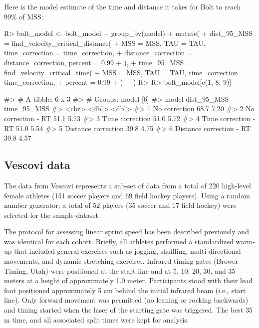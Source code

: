 \documentclass[
]{jss}
\begin{document}
Here is the model estimate of the time and distance it takes for Bolt to reach 99\% of MSS:

\begin{CodeChunk}
\begin{CodeInput}
R> bolt_model <- bolt_model %
+   group_by(model) %
+   mutate(
+     dist_95_MSS = find_velocity_critical_distance(
+       MSS = MSS, TAU = TAU, time_correction = time_correction, 
+       distance_correction = distance_correction, percent = 0.99
+     ),
+    time_95_MSS = find_velocity_critical_time(
+       MSS = MSS, TAU = TAU, time_correction = time_correction, 
+       percent = 0.99
+     )
+   )
R> 
R> bolt_model[c(1, 8, 9)]
\end{CodeInput}
\begin{CodeOutput}
#> # A tibble: 6 x 3
#> # Groups:   model [6]
#>   model                    dist_95_MSS time_95_MSS
#>   <chr>                          <dbl>       <dbl>
#> 1 No correction                   68.7        7.20
#> 2 No correction - RT              51.1        5.73
#> 3 Time correction                 51.0        5.72
#> 4 Time correction - RT            51.0        5.54
#> 5 Distance correction             39.8        4.75
#> 6 Distance correction - RT        39.8        4.57
\end{CodeOutput}
\end{CodeChunk}

\hypertarget{vescovi-data}{%
\subsection{Vescovi data}\label{vescovi-data}}

The data from Vescovi represents a sub-set of data from a total of 220 high-level female athletes (151 soccer players and 69 field hockey players). Using a random number generator, a total of 52 players (35 soccer and 17 field hockey) were selected for the sample dataset.

The protocol for assessing linear sprint speed has been described previously \citep{vescoviImpactMaximumSpeed2014, vescoviLocomotorHeartRateMetabolic2016, vescoviSprintSpeedCharacteristics2012} and was identical for each cohort. Briefly, all athletes performed a standardized warm-up that included general exercises such as jogging, shuffling, multi-directional movements, and dynamic stretching exercises. Infrared timing gates (Brower Timing, Utah) were positioned at the start line and at 5, 10, 20, 30, and 35 meters at a height of approximately 1.0 meter. Participants stood with their lead foot positioned approximately 5 cm behind the initial infrared beam (i.e., start line). Only forward movement was permitted (no leaning or rocking backwards) and timing started when the laser of the starting gate was triggered. The best 35 m time, and all associated split times were kept for analysis.
\end{document}
